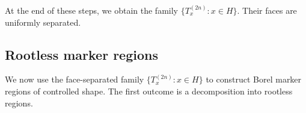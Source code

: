 \documentclass[11pt, reqno, a4paper]{amsart}
\newtheorem{lemma}[theorem]{Lemma}
\theoremstyle{definition}
\theoremstyle{plain}
\begin{document}
At the end of these steps, we obtain the family $\{T_x^{(2n)}:x\in H\}$. 
Their faces are uniformly separated.











\subsection{Rootless marker regions}

We now use the face-separated family $\{T_x^{(2n)}:x\in H\}$ to construct Borel marker regions of controlled shape. The first outcome is a decomposition into rootless regions.
\end{document}
